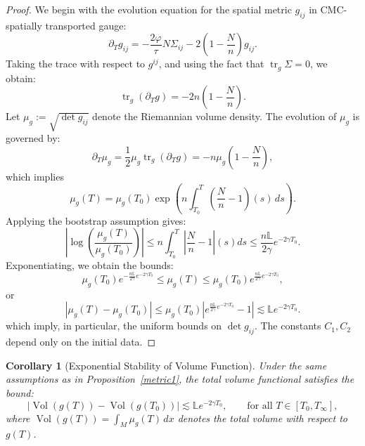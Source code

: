 \documentclass{amsart}
\newtheorem{corollary}{Corollary}[section]
\begin{document}
\begin{proof}
We begin with the evolution equation for the spatial metric \( g_{ij} \) in CMC-spatially transported gauge:
\[
\partial_T g_{ij} = -\frac{2\varphi}{\tau} N \Sigma_{ij} - 2\left(1 - \frac{N}{n}\right) g_{ij}.
\]
Taking the trace with respect to \( g^{ij} \), and using the fact that \( \operatorname{tr}_g \Sigma = 0 \), we obtain:
\[
\operatorname{tr}_g(\partial_T g) = -2n\left(1 - \frac{N}{n}\right).
\]
Let \( \mu_g := \sqrt{\det g_{ij}} \) denote the Riemannian volume density. The evolution of \( \mu_g \) is governed by:
\[
\partial_T \mu_g = \frac{1}{2} \mu_g \operatorname{tr}_g(\partial_T g) = -n \mu_g \left(1 - \frac{N}{n}\right),
\]
which implies
\[
\mu_g(T) = \mu_g(T_0) \exp\left(n \int_{T_0}^{T} \left(\frac{N}{n} - 1 \right)(s) \, ds \right).
\]
Applying the bootstrap assumption gives:
\[
\left| \log\left(\frac{\mu_g(T)}{\mu_g(T_0)}\right) \right| \leq n \int_{T_0}^{T} \left| \frac{N}{n} - 1 \right|(s) ds \leq \frac{n \mathds{L}}{2\gamma} e^{-2\gamma T_0}.
\]
Exponentiating, we obtain the bounds:
\[
\mu_g(T_0) e^{-\frac{n\mathds{L}}{2\gamma} e^{-2\gamma T_0}} \leq \mu_g(T) \leq \mu_g(T_0) e^{\frac{n\mathds{L}}{2\gamma} e^{-2\gamma T_0}},
\]
or 
\[
|\mu_{g}(T)-\mu_{g}(T_{0})|\leq \mu_{g}(T_{0})|e^{\frac{n\mathds{L}}{2\gamma}e^{-2\gamma T_{0}}}-1|\lesssim \mathds{L}e^{-2\gamma T_{0}}. 
\]
which imply, in particular, the uniform bounds on \( \det g_{ij} \). The constants \( C_1, C_2 \) depend only on the initial data.
\end{proof}

\begin{corollary}[Exponential Stability of Volume Function]
\label{cor:volume-stability}
Under the same assumptions as in Proposition~\ref{metric1}, the total volume functional satisfies the bound:
\[
\left| \operatorname{Vol}(g(T)) - \operatorname{Vol}(g(T_0)) \right| \lesssim \mathds{L} e^{-2\gamma T_0}, \qquad \text{for all } T \in [T_0, T_\infty],
\]
where \( \operatorname{Vol}(g(T)) = \int_M \mu_g(T) \, dx \) denotes the total volume with respect to \( g(T) \).
\end{corollary}
\end{document}

